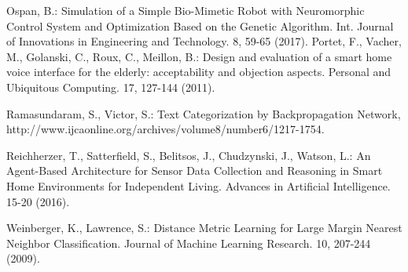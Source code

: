 \documentclass{llncs}
\begin{document}
\begin{thebibliography}{1}
        Ospan, B.: Simulation of a Simple Bio-Mimetic Robot with Neuromorphic Control System and Optimization Based on the Genetic Algorithm. Int. Journal of Innovations in Engineering and Technology. 8, 59-65 (2017).
        Portet, F., Vacher, M., Golanski, C., Roux, C., Meillon, B.: Design and evaluation of a smart home voice interface for the elderly: acceptability and objection aspects. Personal and Ubiquitous Computing. 17, 127-144 (2011).

        Ramasundaram, S., Victor, S.: Text Categorization by Backpropagation Network, http://www.ijcaonline.org/archives/volume8/number6/1217-1754.

        Reichherzer, T., Satterfield, S., Belitsos, J., Chudzynski, J., Watson, L.: An Agent-Based Architecture for Sensor Data Collection and Reasoning in Smart Home Environments for Independent Living. Advances in Artificial Intelligence. 15-20 (2016).

        Weinberger, K., Lawrence, S.: Distance Metric Learning for Large Margin Nearest Neighbor Classification. Journal of Machine Learning Research. 10, 207-244 (2009).

    \end{thebibliography}
\end{document}
